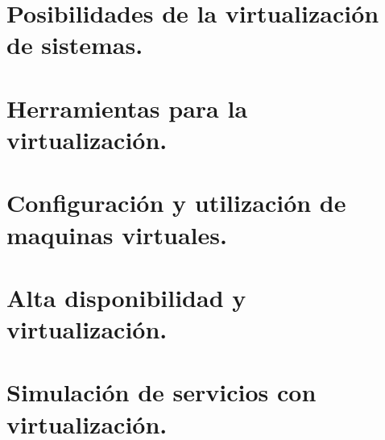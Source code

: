 \documentclass[letterpaper,10pt,spanish]{sphinxmanual}
\begin{document}
\section{Posibilidades de la virtualización de sistemas.}
\label{\detokenize{tema_sad/tema_sad:posibilidades-de-la-virtualizacion-de-sistemas}}

\section{Herramientas para la virtualización.}
\label{\detokenize{tema_sad/tema_sad:herramientas-para-la-virtualizacion}}

\section{Configuración y utilización de maquinas virtuales.}
\label{\detokenize{tema_sad/tema_sad:configuracion-y-utilizacion-de-maquinas-virtuales}}

\section{Alta disponibilidad y virtualización.}
\label{\detokenize{tema_sad/tema_sad:alta-disponibilidad-y-virtualizacion}}

\section{Simulación de servicios con virtualización.}
\label{\detokenize{tema_sad/tema_sad:simulacion-de-servicios-con-virtualizacion}}


\renewcommand{\indexname}{Índice}
\printindex
\end{document}
